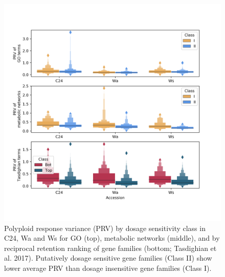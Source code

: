 \documentclass[11pt]{article}
\begin{document}


\begin{figure}[h!]
    \includegraphics[width=\linewidth]{../figures/all_prv_boxen.png}
 \caption{Polyploid response variance (PRV) by dosage sensitivity class in C24, Wa and Ws for GO (top), metabolic networks (middle), and by reciprocal retention ranking of gene families (bottom; Tasdighian et al. 2017). Putatively dosage sensitive gene families (Class II) show lower average PRV than dosage insensitive gene families (Class I).}
  \label{fig3}
\end{figure}
\end{document}
